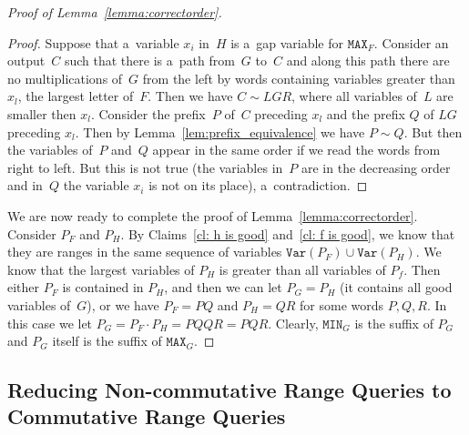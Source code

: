 \documentclass[11pt,letterpaper]{article}
\newcommand{\mmin}{\texttt{MIN}}
\newcommand{\mmax}{\texttt{MAX}}
\newcommand{\var}{\texttt{Var}}
\begin{document}
\begin{proof}[Proof of Lemma~\ref{lemma:correctorder}]
\begin{proof}
Suppose that a~variable $x_i$ in~$H$ is a~gap variable for $\mmax_F$. Consider an output~$C$ such that there is a~path from~$G$ to~$C$ and along this path there are no multiplications of~$G$ from the left by words containing variables greater than $x_l$, the largest letter of~$F$. Then we have $C \sim LGR$, where all variables of~$L$ are smaller then $x_l$. Consider the prefix~$P$ of~$C$ preceding $x_l$ and the prefix $Q$ of $LG$ preceding $x_l$.
Then by Lemma~\ref{lem:prefix_equivalence} we have $P \sim Q$. But then the variables of~$P$ and~$Q$ appear in the same order if we read the words from right to left. But this is not true (the variables in~$P$ are in the decreasing order and in~$Q$ the variable $x_i$ is not on its place), a~contradiction.
\end{proof}

We are now ready to complete the proof of Lemma~\ref{lemma:correctorder}.
Consider $P_F$ and $P_H$. By Claims~\ref{cl: h is good} and~\ref{cl: f is good}, we know that they are ranges in the same sequence of variables $\var(P_F)\cup \var(P_H)$. We know that the largest variables of $P_H$ is greater than all variables of $P_f$. Then either $P_F$ is contained in $P_H$, and then we can let $P_G=P_H$ (it contains all good variables of~$G$), or we have $P_F =PQ$ and $P_H=QR$ for some words $P, Q, R$. In this case we let $P_G = P_F \cdot P_H = PQQR=PQR$. Clearly, $\mmin_G$ is the suffix of $P_G$ and $P_G$ itself is the suffix of $\mmax_G$.
\end{proof}



\subsection{Reducing Non-commutative Range Queries to Commutative Range Queries}
\end{document}
